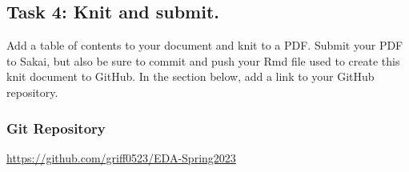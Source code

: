 \documentclass[
]{article}
\begin{document}
\newpage

\hypertarget{task-4-knit-and-submit.}{%
\subsection{Task 4: Knit and submit.}\label{task-4-knit-and-submit.}}

Add a table of contents to your document and knit to a PDF. Submit your
PDF to Sakai, but also be sure to commit and push your Rmd file used to
create this knit document to GitHub. In the section below, add a link to
your GitHub repository.

\hypertarget{git-repository}{%
\subsubsection{Git Repository}\label{git-repository}}

\url{https://github.com/griff0523/EDA-Spring2023}
\end{document}
